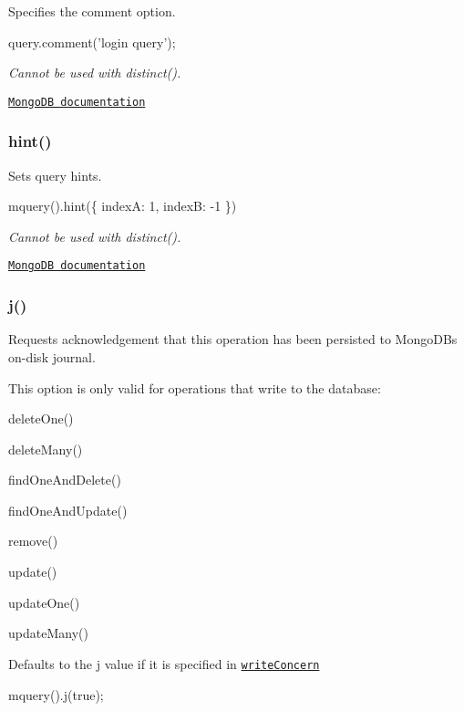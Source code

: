 Specifies the comment option.


\begin{DoxyCode}
query.comment('login query');
\end{DoxyCode}


{\itshape Cannot be used with {\ttfamily distinct()}.}

\href{http://docs.mongodb.org/manual/reference/operator/}{\tt Mongo\+DB documentation}

\subsubsection*{hint()}

Sets query hints.


\begin{DoxyCode}
mquery().hint(\{ indexA: 1, indexB: -1 \})
\end{DoxyCode}


{\itshape Cannot be used with {\ttfamily distinct()}.}

\href{http://docs.mongodb.org/manual/reference/operator/hint/}{\tt Mongo\+DB documentation}

\subsubsection*{j()}

Requests acknowledgement that this operation has been persisted to Mongo\+DB\textquotesingle{}s on-\/disk journal.

This option is only valid for operations that write to the database\+:


\begin{DoxyItemize}
\item {\ttfamily delete\+One()}
\item {\ttfamily delete\+Many()}
\item {\ttfamily find\+One\+And\+Delete()}
\item {\ttfamily find\+One\+And\+Update()}
\item {\ttfamily remove()}
\item {\ttfamily update()}
\item {\ttfamily update\+One()}
\item {\ttfamily update\+Many()}
\end{DoxyItemize}

Defaults to the {\ttfamily j} value if it is specified in \href{#writeconcern}{\tt write\+Concern}


\begin{DoxyCode}
mquery().j(true);
\end{DoxyCode}



